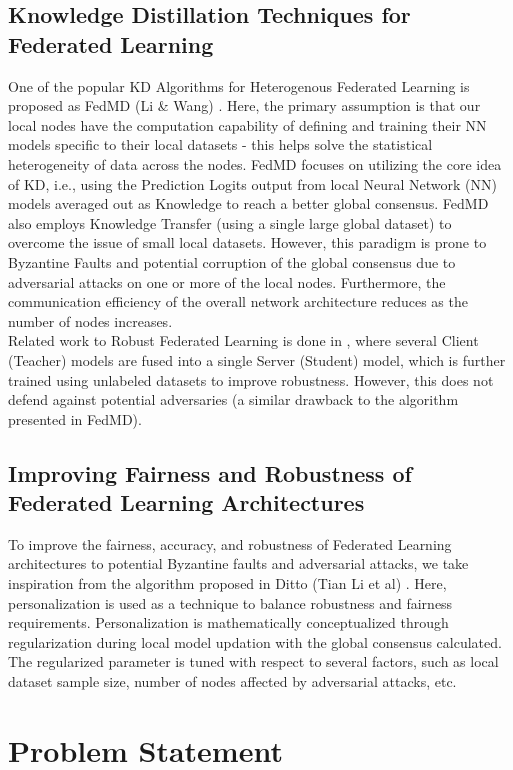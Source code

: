 \documentclass[conference]{IEEEtran}
\begin{document}
\subsection{Knowledge Distillation Techniques for Federated Learning}
One of the popular KD Algorithms for Heterogenous Federated Learning is proposed as FedMD (Li \& Wang) \cite{b4}. Here, the primary assumption is that our local nodes have the computation capability of defining and training their NN models specific to their local datasets - this helps solve the statistical heterogeneity of data across the nodes. FedMD focuses on utilizing the core idea of KD, i.e., using the Prediction Logits output from local Neural Network (NN) models averaged out as Knowledge to reach a better global consensus. FedMD also employs Knowledge Transfer (using a single large global dataset) to overcome the issue of small local datasets. However, this paradigm is prone to Byzantine Faults and potential corruption of the global consensus due to adversarial attacks on one or more of the local nodes. Furthermore, the communication efficiency of the overall network architecture reduces as the number of nodes increases. \\

Related work to Robust Federated Learning is done in \cite{b5}, where several Client (Teacher) models are fused into a single Server (Student) model, which is further trained using unlabeled datasets to improve robustness. However, this does not defend against potential adversaries (a similar drawback to the algorithm presented in FedMD).
\subsection{Improving Fairness and Robustness of Federated Learning Architectures}
To improve the fairness, accuracy, and robustness of Federated Learning architectures to potential Byzantine faults and adversarial attacks, we take inspiration from the algorithm proposed in Ditto (Tian Li et al) \cite{b6}. Here, personalization is used as a technique to balance robustness and fairness requirements. Personalization is mathematically conceptualized through regularization during local model updation with the global consensus calculated. The regularized parameter is tuned with respect to several factors, such as local dataset sample size, number of nodes affected by adversarial attacks, etc.
\section{Problem Statement}
\end{document}

